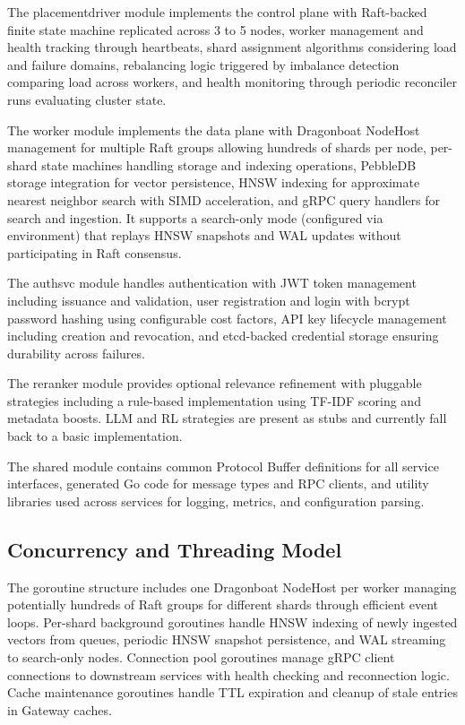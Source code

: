 \documentclass[conference]{IEEEtran}
\begin{document}
The placementdriver module implements the control plane with Raft-backed finite state machine replicated across 3 to 5 nodes, worker management and health tracking through heartbeats, shard assignment algorithms considering load and failure domains, rebalancing logic triggered by imbalance detection comparing load across workers, and health monitoring through periodic reconciler runs evaluating cluster state.

The worker module implements the data plane with Dragonboat NodeHost management for multiple Raft groups allowing hundreds of shards per node, per-shard state machines handling storage and indexing operations, PebbleDB storage integration for vector persistence, HNSW indexing for approximate nearest neighbor search with SIMD acceleration, and gRPC query handlers for search and ingestion. It supports a search-only mode (configured via environment) that replays HNSW snapshots and WAL updates without participating in Raft consensus.

The authsvc module handles authentication with JWT token management including issuance and validation, user registration and login with bcrypt password hashing using configurable cost factors, API key lifecycle management including creation and revocation, and etcd-backed credential storage ensuring durability across failures.

The reranker module provides optional relevance refinement with pluggable strategies including a rule-based implementation using TF-IDF scoring and metadata boosts. LLM and RL strategies are present as stubs and currently fall back to a basic implementation.

The shared module contains common Protocol Buffer definitions for all service interfaces, generated Go code for message types and RPC clients, and utility libraries used across services for logging, metrics, and configuration parsing.

\subsection{Concurrency and Threading Model}

The goroutine structure includes one Dragonboat NodeHost per worker managing potentially hundreds of Raft groups for different shards through efficient event loops. Per-shard background goroutines handle HNSW indexing of newly ingested vectors from queues, periodic HNSW snapshot persistence, and WAL streaming to search-only nodes. Connection pool goroutines manage gRPC client connections to downstream services with health checking and reconnection logic. Cache maintenance goroutines handle TTL expiration and cleanup of stale entries in Gateway caches.
\end{document}
